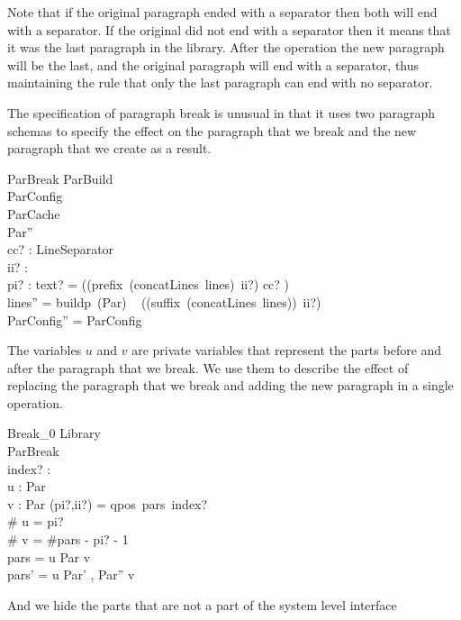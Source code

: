 \documentclass{article}
\begin{document}
Note that if the original paragraph ended with a separator then both will end with a separator. If the original did not end with a separator then it means that it was the last paragraph in the library. After the operation the new paragraph will be the last, and the original paragraph will end with a separator, thus maintaining the rule that only the last paragraph can end with no separator.

The specification of paragraph break is unusual in that it uses two paragraph schemas to specify the effect on the paragraph that we break and the new paragraph that we create as a result.

\begin{schema}{ParBreak}
	ParBuild \\
	\Xi ParConfig \\
	\Xi ParCache \\
	Par'' \\
	cc? : LineSeparator \\
	ii? : \nat \\
	pi? : \nat
\where
	text? = ((prefix~(concatLines~lines)~ii?) \cat \langle cc? \rangle) \\
	lines'' = buildp~(\theta Par) ~ ((suffix~(concatLines~lines))~ii?) \\
	\theta ParConfig'' = \theta ParConfig 
\end{schema}

The variables $u$ and $v$ are private variables that represent the parts before and after the paragraph that we break. We use them to describe the effect of replacing the paragraph that we break and adding the new paragraph in a single operation.

\begin{schema}{Break\_0}
	\Delta Library \\
	ParBreak \\
	index? : \nat \\
	u : \seq Par \\
	v : \seq Par 
\where
	(pi?,ii?) = qpos~pars~index? \\
	\# u = pi? \\
	\# v = \#pars - pi? - 1 \\
	pars = u \cat \langle \theta Par \rangle \cat v \\
	pars' = u \cat \langle \theta Par' , \theta Par'' \rangle \cat v 
\end{schema}

And we hide the parts that are not a part of the system level interface
\end{document}
